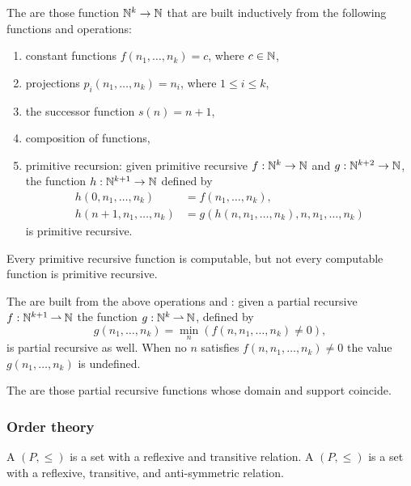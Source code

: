 The  are those function $\mathbb{N}^k \to
\mathbb{N}$ that are built inductively from the following functions and operations:
%
\begin{enumerate}
\item constant functions $f(n_1, \ldots, n_k) = c$, where $c \in \mathbb{N}$,
\item projections $p_i(n_1, \ldots, n_k) = n_i$, where $1 \leq i \leq k$,
\item the successor function $s(n) = n + 1$,
\item composition of functions,
\item primitive recursion: given primitive recursive $f : \mathbb{N}^k \to
  \mathbb{N}$ and $g : \mathbb{N}^{k+2} \to \mathbb{N}$, the function $h : \mathbb{N}^{k+1} \to
  \mathbb{N}$ defined by
  \begin{align*}
    h(0, n_1, \ldots, n_k) &= f(n_1, \ldots, n_k), \\
    h(n+1, n_1, \ldots, n_k) &= g(h(n, n_1, \ldots, n_k), n, n_1,
    \ldots, n_k)    
  \end{align*}
  is primitive recursive.
\end{enumerate}
%
Every primitive recursive function is computable, but not every
computable function is primitive recursive.


The  are built from the above operations and : given a partial recursive $f : \mathbb{N}^{k+1} \mathbin{\rightharpoonup} \mathbb{N}$ the function $g : \mathbb{N}^k \mathbin{\rightharpoonup} \mathbb{N}$, defined by
%
\begin{equation*}
  g(n_1, \ldots, n_k) = \min_n (f(n, n_1, \ldots, n_k) \neq 0),
\end{equation*}
%
is partial recursive as well. When no $n$ satisfies $f(n, n_1, \ldots, n_k) \neq 0$ the value $g(n_1, \ldots, n_k)$ is undefined.

The  are those partial recursive functions whose domain and support coincide.


\subsubsection*{Order theory}

A  $(P, {\leq})$ is a set with a reflexive and
transitive relation.
%
A  $(P, {\leq})$ is a set with a
reflexive, transitive, and anti-symmetric relation.

